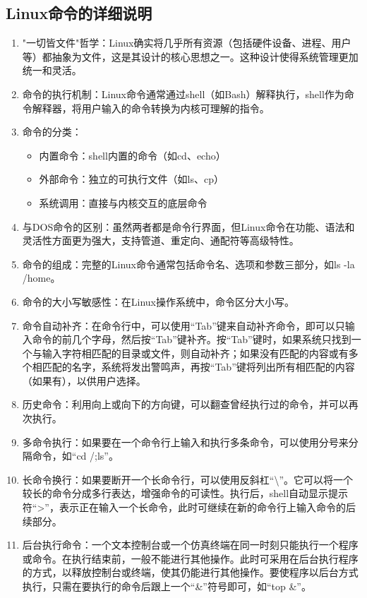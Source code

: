 \documentclass[12pt,UTF8]{ctexbook}
\begin{document}
\subsection{Linux命令的详细说明}
\begin{enumerate}
    \item "一切皆文件"哲学：Linux确实将几乎所有资源（包括硬件设备、进程、用户等）都抽象为文件，这是其设计的核心思想之一。这种设计使得系统管理更加统一和灵活。
    \item 命令的执行机制：Linux命令通常通过shell（如Bash）解释执行，shell作为命令解释器，将用户输入的命令转换为内核可理解的指令。
    \item 命令的分类：
        \begin{itemize}
            \item 内置命令：shell内置的命令（如cd、echo）
            \item 外部命令：独立的可执行文件（如ls、cp）
            \item 系统调用：直接与内核交互的底层命令
        \end{itemize}
    \item 与DOS命令的区别：虽然两者都是命令行界面，但Linux命令在功能、语法和灵活性方面更为强大，支持管道、重定向、通配符等高级特性。
    \item 命令的组成：完整的Linux命令通常包括命令名、选项和参数三部分，如ls -la /home。
    \item 命令的大小写敏感性：在Linux操作系统中，命令区分大小写。
    \item 命令自动补齐：在命令行中，可以使用“Tab”键来自动补齐命令，即可以只输入命令的前几个字母，然后按“Tab”键补齐。按“Tab”键时，如果系统只找到一个与输入字符相匹配的目录或文件，则自动补齐；如果没有匹配的内容或有多个相匹配的名字，系统将发出警鸣声，再按“Tab”键将列出所有相匹配的内容（如果有），以供用户选择。
    \item 历史命令：利用向上或向下的方向键，可以翻查曾经执行过的命令，并可以再次执行。
    \item 多命令执行：如果要在一个命令行上输入和执行多条命令，可以使用分号来分隔命令，如“cd /;ls”。
    \item 长命令换行：如果要断开一个长命令行，可以使用反斜杠“\textbackslash”。它可以将一个较长的命令分成多行表达，增强命令的可读性。执行后，shell自动显示提示符“>”，表示正在输入一个长命令，此时可继续在新的命令行上输入命令的后续部分。
    \item 后台执行命令：一个文本控制台或一个仿真终端在同一时刻只能执行一个程序或命令。在执行结束前，一般不能进行其他操作。此时可采用在后台执行程序的方式，以释放控制台或终端，使其仍能进行其他操作。要使程序以后台方式执行，只需在要执行的命令后跟上一个“\&”符号即可，如“top \&”。
\end{enumerate}
\end{document}
